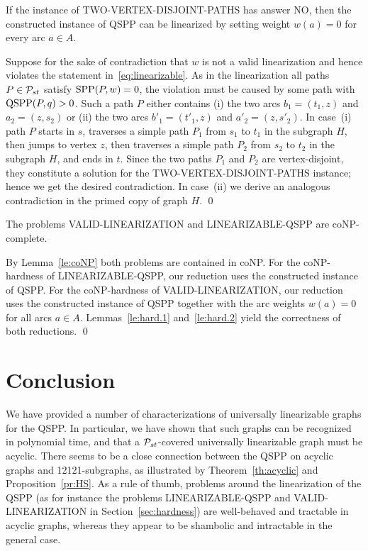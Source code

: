 \documentclass[11pt,fleqn]{article}
\begin{document}
\begin{lemma}
\label{le:hard.2} 
If the instance of TWO-VERTEX-DISJOINT-PATHS has answer NO,
then the constructed instance of QSPP can be linearized by setting weight $w(a)=0$ for every arc $a\in A$.
\end{lemma}
\proof
Suppose for the sake of contradiction that $w$ is not a valid linearization and hence 
violates the statement in~\eqref{eq:linearizable}.
As in the linearization all paths $P\in{\cal P}_{st}$ satisfy $\text{SPP}(P,w)=0$, the violation must
be caused by some path with $\text{QSPP}(P,q)>0$.
Such a path $P$ either contains (i) the two arcs $b_1=(t_1,z)$ and $a_2=(z,s_2)$ or 
(ii) the two arcs $b'_1=(t'_1,z)$ and $a'_2=(z,s'_2)$.
In case~(i) path $P$ starts in $s$, traverses a simple path $P_1$ from $s_1$ to $t_1$ 
in the subgraph $H$, then jumps to vertex $z$, then traverses a simple path $P_2$ from 
$s_2$ to $t_2$ in the subgraph $H$, and ends in $t$.
Since the two paths $P_1$ and $P_2$ are vertex-disjoint, they constitute a solution for 
the TWO-VERTEX-DISJOINT-PATHS instance; hence we get the desired contradiction.
In case~(ii) we derive an analogous contradiction in the primed copy of graph $H$.
\qed

\begin{theorem}
\label{th:hard}
The problems VALID-LINEARIZATION and LINEARIZABLE-QSPP are coNP-complete.
\end{theorem}
\proof
By Lemma~\ref{le:coNP} both problems are contained in coNP.
For the coNP-hardness of LINEARIZABLE-QSPP, our reduction uses the constructed instance of QSPP.
For the coNP-hardness of VALID-LINEARIZATION, our reduction uses the constructed instance of QSPP
together with the arc weights $w(a)=0$ for all arcs $a\in A$.
Lemmas~\ref{le:hard.1} and~\ref{le:hard.2} yield the correctness of both reductions.
\qed


\medskip
\section{Conclusion}
\label{sec:conclusion}
We have provided a number of characterizations of universally linearizable graphs for the QSPP.
In particular, we have shown that such graphs can be recognized in polynomial time,
and that a ${\cal P}_{st}$-covered universally linearizable graph must be acyclic. 
There seems to be a close connection between the QSPP on acyclic graphs and 12121-subgraphs,
as illustrated by Theorem~\ref{th:acyclic} and Proposition~\ref{pr:HS}.
As a rule of thumb, problems around the linearization of the QSPP (as for instance 
the problems LINEARIZABLE-QSPP and VALID-LINEARIZATION in Section~\ref{sec:hardness}) 
are well-behaved and tractable in acyclic graphs, whereas they appear to be shambolic 
and intractable in the general case.
\end{document}
